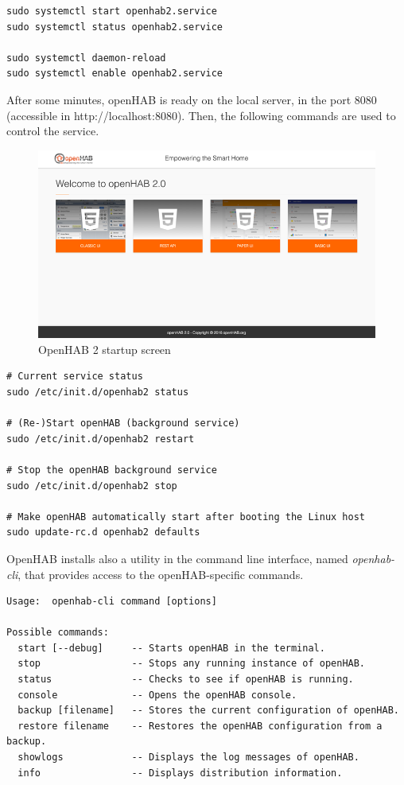 \begin{lstlisting}[style=Consola]
sudo systemctl start openhab2.service
sudo systemctl status openhab2.service

sudo systemctl daemon-reload
sudo systemctl enable openhab2.service
\end{lstlisting}

After some minutes, openHAB is ready on the local server, in the port 8080 (accessible in http://localhost:8080). Then, the following
commands are used to control the service.

\begin{figure}
	\centering
	\includegraphics[width=1\textwidth]{images/Chapter_06/openhab-startup.png}
	\caption{OpenHAB 2 startup screen}
	\label{fig:openhab-startup}
\end{figure}

\begin{lstlisting}[style=Consola]
# Current service status
sudo /etc/init.d/openhab2 status

# (Re-)Start openHAB (background service)
sudo /etc/init.d/openhab2 restart

# Stop the openHAB background service
sudo /etc/init.d/openhab2 stop

# Make openHAB automatically start after booting the Linux host
sudo update-rc.d openhab2 defaults
\end{lstlisting}

OpenHAB installs also a utility in the command line interface, named \textit{openhab-cli}, that provides access to the openHAB-specific 
commands.

\begin{lstlisting}[style=Consola]
Usage:  openhab-cli command [options]

Possible commands:
  start [--debug]     -- Starts openHAB in the terminal.
  stop                -- Stops any running instance of openHAB.
  status              -- Checks to see if openHAB is running.
  console             -- Opens the openHAB console.
  backup [filename]   -- Stores the current configuration of openHAB.
  restore filename    -- Restores the openHAB configuration from a backup.
  showlogs            -- Displays the log messages of openHAB.
  info                -- Displays distribution information.
\end{lstlisting}

